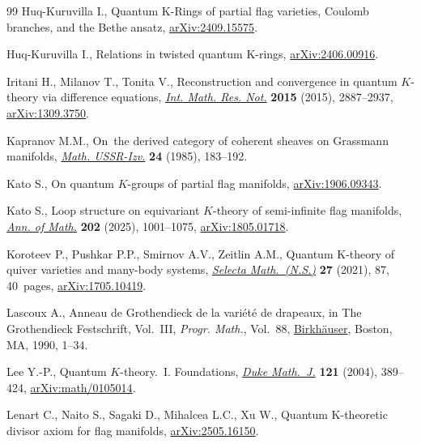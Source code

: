 \documentclass[11pt]{article}
\numberwithin{equation}{section}
\numberwithin{equation}{section}
\theoremstyle{definition}
\begin{document}
\begin{thebibliography}{99}
Huq-Kuruvilla I., Quantum {K}-Rings of partial flag varieties, {C}oulomb
 branches, and the {B}ethe ansatz,
 \href{http://arxiv.org/abs/2409.15575}{arXiv:2409.15575}.

Huq-Kuruvilla I., Relations in twisted quantum {K}-rings,
 \href{http://arxiv.org/abs/2406.00916}{arXiv:2406.00916}.

Iritani H., Milanov T., Tonita V., Reconstruction and convergence in quantum
 {$K$}-theory via difference equations,
 \href{https://doi.org/10.1093/imrn/rnu026}{\textit{Int. Math. Res. Not.}}
 \textbf{2015} (2015), 2887--2937,
 \href{http://arxiv.org/abs/1309.3750}{arXiv:1309.3750}.

Kapranov M.M., On~the derived category of coherent sheaves on Grassmann
 manifolds,
 \href{https://doi.org/10.1070/IM1985v024n01ABEH00122}{\textit{Math.
 USSR-Izv.}} \textbf{24} (1985), 183--192.

Kato S., On quantum $K$-groups of partial flag manifolds,
 \href{http://arxiv.org/abs/1906.09343}{arXiv:1906.09343}.

Kato S., Loop structure on equivariant {$K$}-theory of semi-infinite flag
 manifolds, \href{https://doi.org/10.4007/annals.2025.202.3.2}{\textit{Ann. of
 Math.}} \textbf{202} (2025), 1001--1075,
 \href{http://arxiv.org/abs/1805.01718}{arXiv:1805.01718}.

Koroteev P., Pushkar P.P., Smirnov A.V., Zeitlin A.M., Quantum {K}-theory of
 quiver varieties and many-body systems,
 \href{https://doi.org/10.1007/s00029-021-00698-3}{\textit{Selecta
 Math.~(N.S.)}} \textbf{27} (2021), 87, 40~pages,
 \href{http://arxiv.org/abs/1705.10419}{arXiv:1705.10419}.

Lascoux A., Anneau de {G}rothendieck de la vari\'et\'e de drapeaux, in The
 {G}rothendieck {F}estschrift, {V}ol.~{III}, \textit{Progr. Math.}, Vol.~88,
 \href{https://doi.org/10.1007/978-0-8176-4576-2_1}{Birkh\"auser}, Boston, MA,
 1990, 1--34.

Lee Y.-P., Quantum {$K$}-theory.~{I}. {F}oundations,
 \href{https://doi.org/10.1215/S0012-7094-04-12131-1}{\textit{Duke Math.~J.}}
 \textbf{121} (2004), 389--424,
 \href{http://arxiv.org/abs/math/0105014}{arXiv:math/0105014}.

Lenart C., Naito S., Sagaki D., Mihalcea L.C., Xu W., Quantum {K}-theoretic
 divisor axiom for flag manifolds,
 \href{http://arxiv.org/abs/2505.16150}{arXiv:2505.16150}.


\end{thebibliography}
\end{document}
